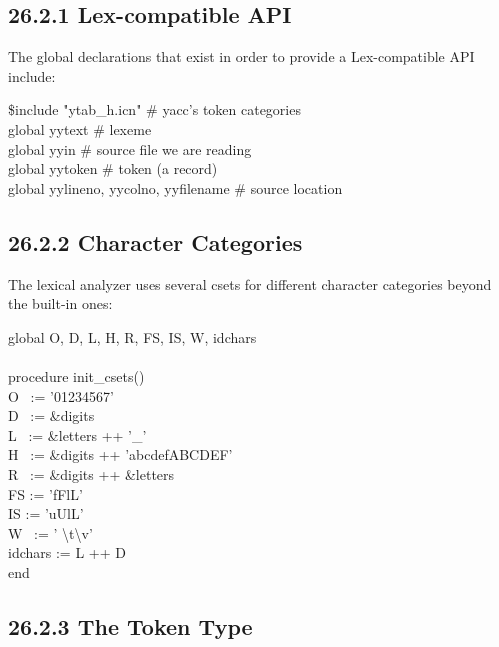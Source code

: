 \subsection[26.2.1 Lex-compatible API]{26.2.1 Lex-compatible API}

The global declarations that exist in order to provide a
Lex-compatible API include:

\begin{iconcode}
\$include "ytab\_h.icn" \> \> \> \> \> \> \> \> \> \> \> \# yacc's token categories \\
global yytext \> \> \> \> \> \> \> \> \> \> \> \# lexeme \\
global yyin \> \> \> \> \> \> \> \> \> \> \> \# source file we are reading \\
global yytoken \> \> \> \> \> \> \> \> \> \> \> \# token (a record) \\
global yylineno, yycolno, yyfilename \> \> \> \> \> \> \> \> \> \> \> \# source location
\end{iconcode}

\subsection[26.2.2 Character Categories]{26.2.2 Character Categories}

The lexical analyzer uses several csets for different character
categories beyond the built-in ones:

\begin{iconcode}
global O, D, L, H, R, FS, IS, W, idchars\\
\ \\
procedure init\_csets() \\
\>   O \ := '01234567' \\
\>   D \ := \&digits \\
\>   L \ := \&letters ++ '\_' \\
\>   H \ := \&digits ++ 'abcdefABCDEF' \\
\>   R \ := \&digits ++ \&letters \\
\>   FS := 'fFlL' \\
\>   IS := 'uUlL' \\
\>   W \ := ' {\textbackslash}t{\textbackslash}v' \\
\>   idchars := L ++ D \\
end
\end{iconcode}

\subsection[26.2.3 The Token Type]{26.2.3 The Token Type}

